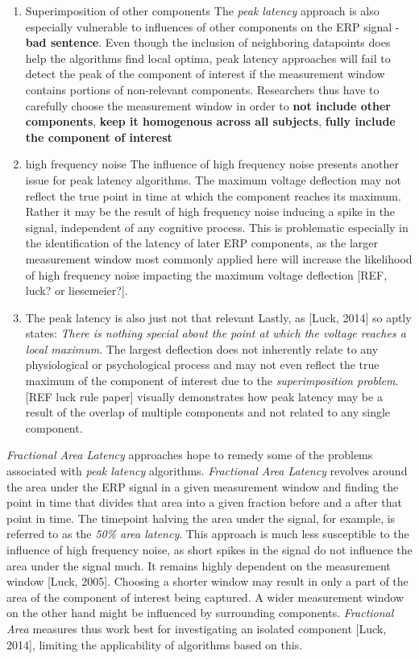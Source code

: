 \documentclass[
  man,floatsintext]{apa7}
\begin{document}
\begin{enumerate}
\def\labelenumi{\arabic{enumi}.}
\setcounter{enumi}{1}
\item
  Superimposition of other components
  The \emph{peak latency} approach is also especially vulnerable to influences of other components on the ERP signal - \textbf{bad sentence}. Even though the inclusion of neighboring datapoints does help the algorithms find local optima, peak latency approaches will fail to detect the peak of the component of interest if the measurement window contains portions of non-relevant components. Researchers thus have to carefully choose the measurement window in order to \textbf{not include other components}, \textbf{keep it homogenous across all subjects}, \textbf{fully include the component of interest}
\item
  high frequency noise
  The influence of high frequency noise presents another issue for peak latency algorithms. The maximum voltage deflection may not reflect the true point in time at which the component reaches its maximum. Rather it may be the result of high frequency noise inducing a spike in the signal, independent of any cognitive process. This is problematic especially in the identification of the latency of later ERP components, as the larger measurement window most commonly applied here will increase the likelihood of high frequency noise impacting the maximum voltage deflection {[}REF, luck? or liesemeier?{]}.
\item
  The peak latency is also just not that relevant
  Lastly, as {[}Luck, 2014{]} so aptly states: \emph{There is nothing special about the point at which the voltage reaches a local maximum}. The largest deflection does not inherently relate to any physiological or psychological process and may not even reflect the true maximum of the component of interest due to the \emph{superimposition problem}. {[}REF luck rule paper{]} visually demonstrates how peak latency may be a result of the overlap of multiple components and not related to any single component.
\end{enumerate}

\emph{Fractional Area Latency} approaches hope to remedy some of the problems associated with \emph{peak latency} algorithms. \emph{Fractional Area Latency} revolves around the area under the ERP signal in a given measurement window and finding the point in time that divides that area into a given fraction before and a after that point in time. The timepoint halving the area under the signal, for example, is referred to as the \emph{50\% area latency}. This approach is much less susceptible to the influence of high frequency noise, as short spikes in the signal do not influence the area under the signal much. It remains highly dependent on the measurement window {[}Luck, 2005{]}. Choosing a shorter window may result in only a part of the area of the component of interest being captured. A wider measurement window on the other hand might be influenced by surrounding components. \emph{Fractional Area} measures thus work best for investigating an isolated component {[}Luck, 2014{]}, limiting the applicability of algorithms based on this.
\end{document}
